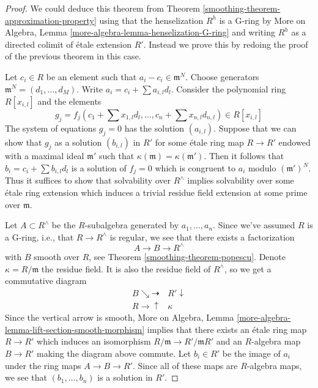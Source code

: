 \begin{proof}

We could deduce this theorem from Theorem \ref{smoothing-theorem-approximation-property}
using that the henselization $R^h$ is a G-ring by
More on Algebra, Lemma \ref{more-algebra-lemma-henselization-G-ring}
and writing $R^h$ as a directed colimit of \'etale extension $R'$.
Instead we prove this by redoing the proof of the previous theorem
in this case.

\medskip\noindent
Let $c_i \in R$ be an element such that $a_i - c_i \in \mathfrak m^N$.
Choose generators $\mathfrak m^N = (d_1, \ldots, d_M)$.
Write $a_i = c_i + \sum a_{i, l} d_l$.
Consider the polynomial ring $R[x_{i, l}]$ and the elements
$$
g_j = f_j(c_1 + \sum x_{1, l} d_l , \ldots, c_n + \sum x_{n, l} d_{n, l})
\in R[x_{i, l}]
$$
The system of equations $g_j = 0$ has the solution $(a_{i, l})$.
Suppose that we can show that $g_j$ as a solution $(b_{i, l})$ in $R'$
for some \'etale ring map $R \to R'$ endowed with a maximal ideal
$\mathfrak m'$ such that $\kappa(\mathfrak m) = \kappa(\mathfrak m')$.
Then it follows that $b_i = c_i + \sum b_{i, l}d_l$ is a solution
of $f_j = 0$ which is congruent to $a_i$ modulo $(\mathfrak m')^N$.
Thus it suffices to show that solvability over $R^\wedge$ implies
solvability over some \'etale ring extension which induces a trivial
residue field extension at some prime over $\mathfrak m$.

\medskip\noindent
Let $A \subset R^\wedge$ be the $R$-subalgebra generated by
$a_1, \ldots, a_n$. Since we've assumed $R$ is a G-ring, i.e.,
that $R \to R^\wedge$ is regular, we see that
there exists a factorization
$$
A \to B \to R^\wedge
$$
with $B$ smooth over $R$, see Theorem \ref{smoothing-theorem-popescu}.
Denote $\kappa = R/\mathfrak m$ the residue field. It is also
the residue field of $R^\wedge$, so we get a commutative diagram
$$
\begin{array}{cc}B \searrow\dashrightarrow & R' \downarrow \\ R \longrightarrow\uparrow & \kappa\end{array}
$$
Since the vertical arrow is smooth,
More on Algebra, Lemma \ref{more-algebra-lemma-lift-section-smooth-morphism}
implies that there exists an \'etale ring map $R \to R'$
which induces an isomorphism $R/\mathfrak m \to R'/\mathfrak mR'$
and an $R$-algebra map $B \to R'$ making the diagram above commute.
Let $b_i \in R'$ be the image of $a_i$ under the ring maps
$A \to B \to R'$. Since all of these maps are $R$-algebra
maps, we see that $(b_1, \ldots, b_n)$ is a solution in $R'$.
\end{proof}

